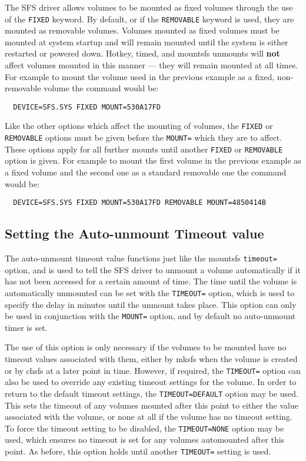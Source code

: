 The SFS driver allows volumes to be mounted as fixed volumes through the use of
the {\tt FIXED} keyword.  By default, or if the {\tt REMOVABLE} keyword is used, they are
mounted as removable volumes.  Volumes mounted as fixed volumes must be mounted
at system startup and will remain mounted until the system is either restarted
or powered down.  Hotkey, timed, and mountsfs unmounts will {\bf not} affect volumes
mounted in this manner --- they will remain mounted at all times.  For example to
mount the volume used in the previous example as a fixed, non-removable volume
the command would be:

{\tt \verb|  |DEVICE=SFS.SYS FIXED MOUNT=530A17FD}

Like the other options which affect the mounting of volumes, the {\tt FIXED} or
\linebreak 
{\tt REMOVABLE} options must be given before the {\tt MOUNT=} which they are to affect.
These options apply for all further mounts until another {\tt FIXED} or {\tt REMOVABLE}
option is given.  For example to mount the first volume in the previous example
as a fixed volume and the second one as a standard removable one the command
would be:

{\tt \verb|  |DEVICE=SFS.SYS FIXED MOUNT=530A17FD REMOVABLE MOUNT=4850414B}


\subsection{Setting the Auto-unmount Timeout value}

The auto-unmount timeout value functions just like the mountsfs {\tt timeout=}
option, and is used to tell the SFS driver to unmount a volume automatically if
it has not been accessed for a certain amount of time.  The time until the
volume is automatically unmounted can be set with the {\tt TIMEOUT=} option, which 
is used to specify the delay in minutes until the unmount takes place.  This 
option can only be used in conjunction with the {\tt MOUNT=} option, and by default 
no auto-unmount timer is set.

The use of this option is only necessary if the volumes to be mounted have no 
timeout values associated with them, either by mksfs when the volume is created 
or by chsfs at a later point in time.  However, if required, the {\tt TIMEOUT=} 
option can also be used to override any existing timeout settings for the 
volume.  In order to return to the default timeout settings, the
{\tt TIMEOUT=DEFAULT} option may be used.  This sets the timeout of any volumes
mounted after this point to either the value associated with the volume, or
none at all if the volume has no timeout setting.  To force the timeout setting
to be disabled, the {\tt TIMEOUT=NONE} option may be used, which ensures no timeout 
is set for any volumes automounted after this point.  As before, this option holds 
until another {\tt TIMEOUT=} setting is used.


